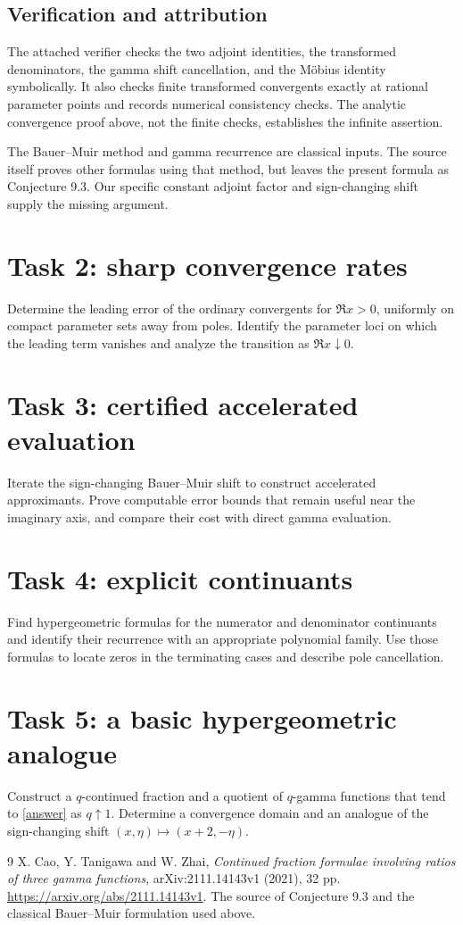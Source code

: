 \documentclass[11pt]{article}
\begin{document}
\subsection*{Verification and attribution}
The attached verifier checks the two adjoint identities, the
transformed denominators, the gamma shift cancellation, and the
M\"obius identity symbolically. It also checks finite transformed
convergents exactly at rational parameter points and records
numerical consistency checks. The analytic convergence proof above,
not the finite checks, establishes the infinite assertion.

The Bauer--Muir method and gamma recurrence are classical inputs.
The source itself proves other formulas using that method, but
leaves the present formula as Conjecture 9.3. Our specific constant
adjoint factor and sign-changing shift supply the missing argument.

\section*{Task 2: sharp convergence rates}
Determine the leading error of the ordinary convergents for
\(\Re x>0\), uniformly on compact parameter sets away from poles.
Identify the parameter loci on which the leading term vanishes
and analyze the transition as \(\Re x\downarrow0\).

\section*{Task 3: certified accelerated evaluation}
Iterate the sign-changing Bauer--Muir shift to construct accelerated
approximants. Prove computable error bounds that remain useful near
the imaginary axis, and compare their cost with direct gamma evaluation.

\section*{Task 4: explicit continuants}
Find hypergeometric formulas for the numerator and denominator
continuants and identify their recurrence with an appropriate
polynomial family. Use those formulas to locate zeros in the
terminating cases and describe pole cancellation.

\section*{Task 5: a basic hypergeometric analogue}
Construct a \(q\)-continued fraction and a quotient of \(q\)-gamma
functions that tend to \eqref{answer} as \(q\uparrow1\).
Determine a convergence domain and an analogue of the sign-changing
shift \((x,\eta)\mapsto(x+2,-\eta)\).

\begin{thebibliography}{9}
X. Cao, Y. Tanigawa and W. Zhai,
\emph{Continued fraction formulae involving ratios of three gamma functions},
arXiv:2111.14143v1 (2021), 32 pp.
\url{https://arxiv.org/abs/2111.14143v1}.
The source of Conjecture 9.3 and the classical Bauer--Muir formulation
used above.
\end{thebibliography}
\end{document}
